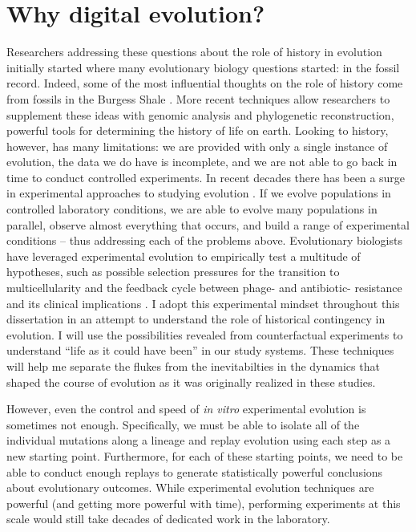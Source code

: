 \section{Why digital evolution?}

Researchers addressing these questions about the role of history in evolution initially started where many evolutionary biology questions started: in the fossil record. 
Indeed, some of the most influential thoughts on the role of history come from fossils in the Burgess Shale \citep{gouldWonderfulLifeBurgess1990}.
More recent techniques allow researchers to supplement these ideas with genomic analysis and phylogenetic reconstruction, powerful tools for determining the history of life on earth. 
Looking to history, however, has many limitations: we are provided with only a single instance of evolution, the data we do have is incomplete, and we are not able to go back in time to conduct controlled experiments.
In recent decades there has been a surge in experimental approaches to studying evolution \citep{kaweckiExperimentalEvolution2012}.
If we evolve populations in controlled laboratory conditions, we are able to evolve many populations in parallel, observe almost everything that occurs, and build a range of experimental conditions -- thus addressing each of the problems above.
Evolutionary biologists have leveraged experimental evolution to empirically test a multitude of hypotheses, such as possible selection pressures for the transition to multicellularity \citep{ratcliffExperimentalEvolutionMulticellularity2012} and the feedback cycle between phage- and antibiotic- resistance and its clinical implications \citep{kortrightPhageTherapyRenewed2019, chanPhageSelectionRestores2016}.
I adopt this experimental mindset throughout this dissertation in an attempt to understand the role of historical contingency in evolution. 
I will use the possibilities revealed from counterfactual experiments to understand ``life as it could have been'' in our study systems.
These techniques will help me separate the flukes from the inevitabilties in the dynamics that shaped the course of evolution as it was originally realized in these studies.

However, even the control and speed of \textit{in vitro} experimental evolution is sometimes not enough. 
Specifically, we must be able to isolate all of the individual mutations along a lineage and replay evolution using each step as a new starting point.
Furthermore, for each of these starting points, we need to be able to conduct enough replays to generate statistically powerful conclusions about evolutionary outcomes.
While experimental evolution techniques are powerful (and getting more powerful with time), performing experiments at this scale would still take decades of dedicated work in the laboratory. 

